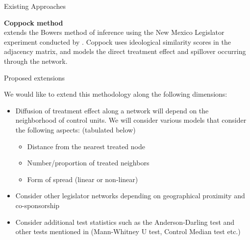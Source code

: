 \documentclass[final]{beamer}
\newlength{\onecolwid}
\newlength{\onecolwidd}
\begin{document}
\begin{frame}[t]
\begin{columns}[t]
\begin{column}{\onecolwidd}
\begin{block}{Existing Approaches}
\begin{rmfamily}
\hspace{2cm}

	{\Large \textbf{Coppock method}}\\
	\citealt{coppock2014information} extends the Bowers method of inference using the New Mexico Legislator experiment conducted by \citealt{butler2011can}. Coppock uses ideological similarity scores in the adjacency matrix, and models the direct treatment effect and spillover occurring through the network.
	
	\end{rmfamily}
	\end{block}
	
	\hspace{2cm}
						
	
	\begin{block}{Proposed extensions}
	\begin{rmfamily}

	We would like to extend this methodology along the following dimensions:
	
	\begin{itemize}
	\item Diffusion of treatment effect along a network will depend on the neighborhood of control units. We will consider various models that consider the following aspects: (tabulated below)
	
	\begin{itemize}
	\item Distance from the nearest treated node
	\item Number/proportion of treated neighbors
	\item Form of spread (linear or non-linear)
	\end{itemize}
	
	\vspace*{.1in}
	\item Consider other legislator networks depending on geographical proximity and co-sponsorship
	\vspace*{.1in}
	\item Consider additional test statistics such as the Anderson-Darling test and other tests mentioned in \citep{rosenbaum2012interference} (Mann-Whitney U test, Control Median test etc.)
	\vspace*{.1in}
	\end{itemize}	

	\end{rmfamily}						
	\end{block}
	

\end{column}
\end{columns}
\end{frame}
\end{document}
